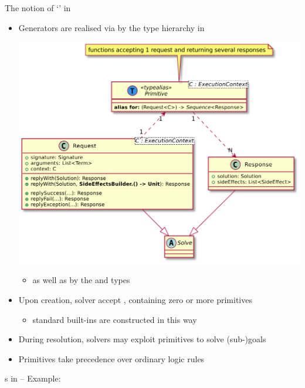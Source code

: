 \documentclass[presentation]{beamer}\mode<presentation>{\usetheme{AMSBolognaFC}}
\begin{document}
\begin{frame}[allowframebreaks]{The notion of `' in \twopkt{}}
    \begin{itemize}
        \item Generators are realised via by the  type hierarchy in \twopkt{}
        \begin{center}
            \includegraphics[width=.5\linewidth]{figures/primitive.pdf}
        \end{center}
        \begin{itemize}
            \item as well as by the  and  types
        \end{itemize}

        \framebreak

        \item Upon creation, solver accept , containing zero or more primitives
        \begin{itemize}
            \item standard built-ins are constructed in this way
        \end{itemize}

        \bigskip

        \item During resolution, solvers may exploit primitives to solve (sub-)goals 
        
        \bigskip

        \item Primitives take precedence over ordinary logic rules
    \end{itemize}
\end{frame}

\begin{frame}{s in \twopkt{} -- Example: }
\end{frame}
\end{document}
